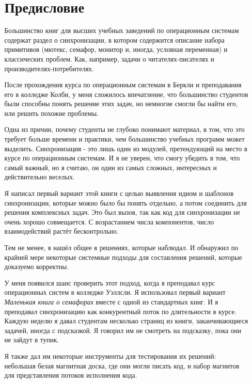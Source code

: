 \chapter{Предисловие}

Большинство книг для высших учебных заведений по операционным системам
содержат раздел о синхронизации, в котором содержится описание набора примитивов
(мютекс, семафор, монитор и, иногда, условная переменная) и классических проблем.
Как, например, задачи о читателях-писателях и производителях-потребителях.

После прохождения курса по операционным системам в Беркли 
и преподавания его в колледже Колби, у меня сложилось впечатление,
что большинство студентов были способны понять решение этих задач,
но немногие смогли бы найти его, или решить похожие проблемы.

Одна из причин, почему студенты не глубоко понимают материал, в том,
что это требует больше времени и практики,
чем большинство учебных программ может выделить.
Синхронизация - это лишь один из модулей, претендующий на место в 
курсе по операционным системам.
И я не уверен, что смогу убедить в том, что самый важный, но я считаю,
он один из самых сложных, интересных и действительно веселых.

Я написал первый вариант этой книги с целью выявления
идиом и шаблонов синхронизации, которые можно было бы понять отдельно,
а потом соединить для решения комплексных задач.
Это был вызов, так как код для синхронизации не очень хорошо совмещается.
С возрастанием числа компонентов, число взаимодействий растёт бесконтрольно.

Тем не менее, я нашёл общее в решениях, которые наблюдал.
И обнаружил по крайней мере некоторые системные подходы для составления решений,
которые доказуемо корректны.

У меня появился шанс проверить этот подход, когда я преподавал курс
операционных систем в колледже Уэллсли.
Я использовал первый вариант {\em Маленькая книга о семафорах}
вместе с одной из стандартных книг.
И я преподавал синхронизацию как конкурентный поток по длительности в курсе.
Каждую неделю я давал студентам несколько страниц из книги,
заканчивающиеся задачей, иногда с подсказкой.
Я говорил им не смотреть на подсказку, пока они не зайдут в тупик.

Я также дал им некоторые инструменты для тестирования их решений:
небольшая белая магнитная доска, где они могли писать код, и набор магнитов
для представления потоков исполнения кода.

